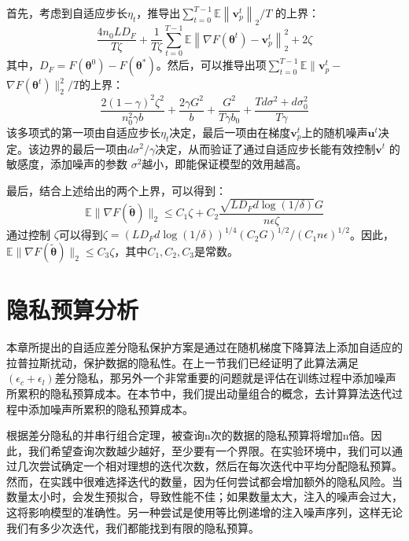 首先，考虑到自适应步长$\eta_{t}$，推导出$\sum_{t=0}^{T-1} \mathbb{E}\left\|\mathbf{v}_{p}^{t}\right\|_{2} / T$ 的上界：
$$
\frac{4 n_{0} L D_{F}}{T \zeta}+\frac{1}{T \zeta} \sum_{t=0}^{T-1} \mathbb{E}\left\|\nabla F\left(\boldsymbol{\theta}^{t}\right)-\mathbf{v}_{p}^{t}\right\|_{2}^{2}+2 \zeta
$$
其中，$D_{F}=F\left(\boldsymbol{\theta}^{0}\right)-F\left(\boldsymbol{\theta}^{*}\right)$。然后，可以推导出项$\sum_{t=0}^{T-1} \mathbb{E} \| \mathbf{v}_{p}^{t}-$ $\nabla F\left(\boldsymbol{\theta}^{t}\right) \|_{2}^{2} / T$的上界：
$$
\frac{2(1-\gamma)^{2} \zeta^{2}}{n_{0}^{2} \gamma b}+\frac{2 \gamma G^{2}}{b}+\frac{G^{2}}{T \gamma b_{0}}+\frac{T d \sigma^{2}+d \sigma_{0}^{2}}{T \gamma}
$$
该多项式的第一项由自适应步长$\eta_{t}$决定，最后一项由在梯度$\mathbf{v}_{p}^{t}$上的随机噪声$\mathbf{u}^{t}$决定。该边界的最后一项由$d \sigma^{2} / \gamma$决定，从而验证了通过自适应步长能有效控制$\mathbf{v}^{t}$ 的敏感度，添加噪声的参数 $\sigma^{2}$越小，即能保证模型的效用越高。

最后，结合上述给出的两个上界，可以得到：
$$
\mathbb{E}\|\nabla F(\widetilde{\boldsymbol{\theta}})\|_{2} \leq C_{1} \zeta+C_{2} \frac{\sqrt{L D_{F} d \log (1 / \delta)} G}{n \epsilon \zeta}
$$
通过控制 $\zeta$可以得到$\zeta=\left(L D_{F} d \log (1 / \delta)\right)^{1 / 4}\left(C_{2} G\right)^{1 / 2} /\left(C_{1} n \epsilon\right)^{1 / 2}$。因此，$\mathbb{E}\|\nabla F(\widetilde{\boldsymbol{\theta}})\|_{2} \leq C_{3} \zeta$，其中$C_{1}, C_{2}, C_{3}$是常数。

\section{隐私预算分析}
本章所提出的自适应差分隐私保护方案是通过在随机梯度下降算法上添加自适应的拉普拉斯扰动，保护数据的隐私性。在上一节我们已经证明了此算法满足$\left(\epsilon_{c}+\epsilon_{l}\right)$差分隐私，那另外一个非常重要的问题就是评估在训练过程中添加噪声所累积的隐私预算成本。在本节中，我们提出动量组合的概念，去计算算法迭代过程中添加噪声所累积的隐私预算成本。

根据差分隐私的并串行组合定理，被查询n次的数据的隐私预算将增加n倍。因此，我们希望查询次数越少越好，至少要有一个界限。在实验环境中，我们可以通过几次尝试确定一个相对理想的迭代次数，然后在每次迭代中平均分配隐私预算。然而，在实践中很难选择迭代的数量，因为任何尝试都会增加额外的隐私风险。当数量太小时，会发生预拟合，导致性能不佳；如果数量太大，注入的噪声会过大，这将影响模型的准确性。另一种尝试是使用等比例递增的注入噪声序列，这样无论我们有多少次迭代，我们都能找到有限的隐私预算。

